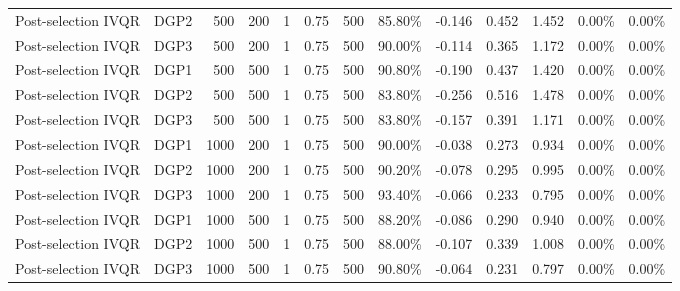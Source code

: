 \begin{landscape}
\begin{longtable}{llrrrrrrrrrrr}
Post-selection IVQR & DGP2 & 500 & 200 & 1 & 0.75 & 500 & 85.80\% & -0.146 & 0.452 & 1.452 & 0.00\% & 0.00\% \\
Post-selection IVQR & DGP3 & 500 & 200 & 1 & 0.75 & 500 & 90.00\% & -0.114 & 0.365 & 1.172 & 0.00\% & 0.00\% \\
Post-selection IVQR & DGP1 & 500 & 500 & 1 & 0.75 & 500 & 90.80\% & -0.190 & 0.437 & 1.420 & 0.00\% & 0.00\% \\
Post-selection IVQR & DGP2 & 500 & 500 & 1 & 0.75 & 500 & 83.80\% & -0.256 & 0.516 & 1.478 & 0.00\% & 0.00\% \\
Post-selection IVQR & DGP3 & 500 & 500 & 1 & 0.75 & 500 & 83.80\% & -0.157 & 0.391 & 1.171 & 0.00\% & 0.00\% \\
Post-selection IVQR & DGP1 & 1000 & 200 & 1 & 0.75 & 500 & 90.00\% & -0.038 & 0.273 & 0.934 & 0.00\% & 0.00\% \\
Post-selection IVQR & DGP2 & 1000 & 200 & 1 & 0.75 & 500 & 90.20\% & -0.078 & 0.295 & 0.995 & 0.00\% & 0.00\% \\
Post-selection IVQR & DGP3 & 1000 & 200 & 1 & 0.75 & 500 & 93.40\% & -0.066 & 0.233 & 0.795 & 0.00\% & 0.00\% \\
Post-selection IVQR & DGP1 & 1000 & 500 & 1 & 0.75 & 500 & 88.20\% & -0.086 & 0.290 & 0.940 & 0.00\% & 0.00\% \\
Post-selection IVQR & DGP2 & 1000 & 500 & 1 & 0.75 & 500 & 88.00\% & -0.107 & 0.339 & 1.008 & 0.00\% & 0.00\% \\
Post-selection IVQR & DGP3 & 1000 & 500 & 1 & 0.75 & 500 & 90.80\% & -0.064 & 0.231 & 0.797 & 0.00\% & 0.00\% \\
\end{longtable}
\endgroup
\end{landscape}
